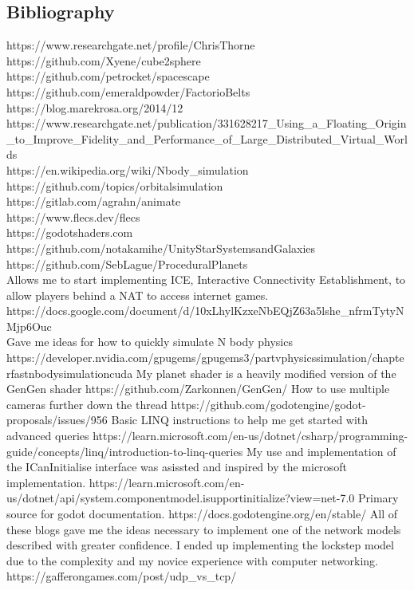\documentclass[12pt, DIV=calc]{scrartcl}
\begin{document}
\subsection{Bibliography}


https://www.researchgate.net/profile/Chris\-Thorne \\
https://github.com/Xyene/cube2sphere \\
https://github.com/petrocket/spacescape \\
https://github.com/emeraldpowder/FactorioBelts \\
https://blog.marekrosa.org/2014/12 \\
https://www.researchgate.net/publication/331628217\_Using\_a\_Floating\_Origin\_to\_Improve\_Fidelity\_and\_Performance\_of\_Large\_Distributed\_Virtual\_Worlds \\
https://en.wikipedia.org/wiki/N\-body\_simulation \\
https://github.com/topics/orbital\-simulation \\
https://gitlab.com/agrahn/animate \\
https://www.flecs.dev/flecs \\
https://godotshaders.com \\
https://github.com/notakamihe/Unity\-Star\-Systems\-and\-Galaxies \\
https://github.com/SebLague/Procedural\-Planets \\
Allows me to start implementing ICE, Interactive Connectivity Establishment, to allow players behind a NAT to access internet games. https://docs.google.com/document/d/10xLhy\-lKzxeNbEQjZ63a5lshe\-\_nfrmTytyNMjp6Ouc \\
Gave me ideas for how to quickly simulate N body physics https://developer.nvidia.com/gpugems/gpugems3/part\-v\-physics\-simulation/chapter\-fast\-n\-body\-simulation\-cuda
My planet shader is a heavily modified version of the GenGen shader https://github.com/Zarkonnen/GenGen/
How to use multiple cameras further down the thread https://github.com/godotengine/godot-proposals/issues/956
Basic LINQ instructions to help me get started with advanced queries https://learn.microsoft.com/en-us/dotnet/csharp/programming-guide/concepts/linq/introduction-to-linq-queries
My use and implementation of the ICanInitialise interface was asissted and inspired by the microsoft implementation. https://learn.microsoft.com/en-us/dotnet/api/system.componentmodel.isupportinitialize?view=net-7.0
Primary source for godot documentation. https://docs.godotengine.org/en/stable/
All of these blogs gave me the ideas necessary to implement one of the network models described with greater confidence. I ended up implementing the lockstep model due to the complexity and my novice experience with computer networking. https://gafferongames.com/post/udp_vs_tcp/
\end{document}
